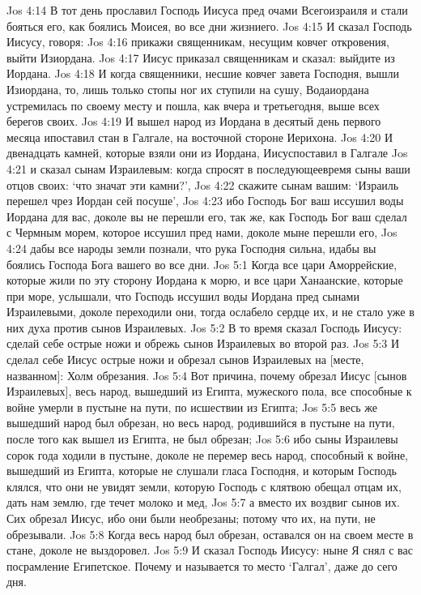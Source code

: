 Jos 4:14  В тот день прославил Господь Иисуса пред очами Всегоизраиля и стали бояться его, как боялись Моисея, во все дни жизниего.
Jos 4:15  И сказал Господь Иисусу, говоря:
Jos 4:16  прикажи священникам, несущим ковчег откровения, выйти Изиордана.
Jos 4:17  Иисус приказал священникам и сказал: выйдите из Иордана.
Jos 4:18  И когда священники, несшие ковчег завета Господня, вышли Изиордана, то, лишь только стопы ног их ступили на сушу, Водаиордана устремилась по своему месту и пошла, как вчера и третьегодня, выше всех берегов своих.
Jos 4:19  И вышел народ из Иордана в десятый день первого месяца ипоставил стан в Галгале, на восточной стороне Иерихона.
Jos 4:20  И двенадцать камней, которые взяли они из Иордана, Иисуспоставил в Галгале
Jos 4:21  и сказал сынам Израилевым: когда спросят в последующеевремя сыны ваши отцов своих: `что значат эти камни?',
Jos 4:22  скажите сынам вашим: `Израиль перешел чрез Иордан сей посуше',
Jos 4:23  ибо Господь Бог ваш иссушил воды Иордана для вас, доколе вы не перешли его, так же, как Господь Бог ваш сделал с Чермным морем, которое иссушил пред нами, доколе мыне перешли его,
Jos 4:24  дабы все народы земли познали, что рука Господня сильна, идабы вы боялись Господа Бога вашего во все дни.
Jos 5:1  Когда все цари Аморрейские, которые жили по эту сторону Иордана к морю, и все цари Ханаанские, которые при море, услышали, что Господь иссушил воды Иордана пред сынами Израилевыми, доколе переходили они, тогда ослабело сердце их, и не стало уже в них духа против сынов Израилевых.
Jos 5:2  В то время сказал Господь Иисусу: сделай себе острые ножи и обрежь сынов Израилевых во второй раз.
Jos 5:3  И сделал себе Иисус острые ножи и обрезал сынов Израилевых на [месте, названном]: Холм обрезания.
Jos 5:4  Вот причина, почему обрезал Иисус [сынов Израилевых], весь народ, вышедший из Египта, мужеского пола, все способные к войне умерли в пустыне на пути, по исшествии из Египта;
Jos 5:5  весь же вышедший народ был обрезан, но весь народ, родившийся в пустыне на пути, после того как вышел из Египта, не был обрезан;
Jos 5:6  ибо сыны Израилевы сорок года ходили в пустыне, доколе не перемер весь народ, способный к войне, вышедший из Египта, которые не слушали гласа Господня, и которым Господь клялся, что они не увидят земли, которую Господь с клятвою обещал отцам их, дать нам землю, где течет молоко и мед,
Jos 5:7  а вместо их воздвиг сынов их. Сих обрезал Иисус, ибо они были необрезаны; потому что их, на пути, не обрезывали.
Jos 5:8  Когда весь народ был обрезан, оставался он на своем месте в стане, доколе не выздоровел.
Jos 5:9  И сказал Господь Иисусу: ныне Я снял с вас посрамление Египетское. Почему и называется то место `Галгал', даже до сего дня.
